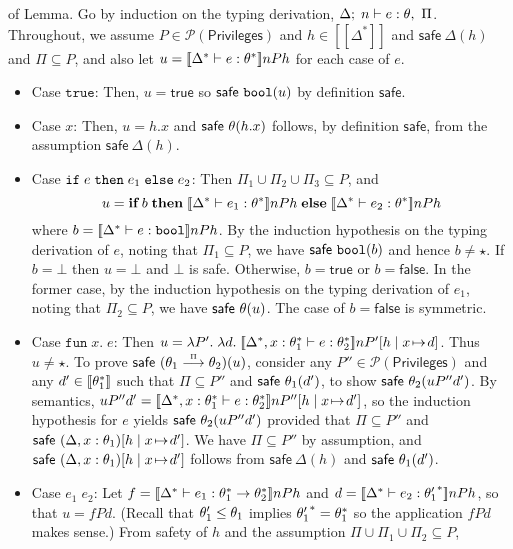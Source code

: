 \documentclass[submission,copyright,creativecommons]{eptcs}
\newcommand{\ifthenelse}[3]{\IF\;#1\;\THEN\;#2\;\ELSE\;#3}
\newcommand{\mifthenelse}[3]{\MIF\;#1\;\MTHEN\;#2\;\MELSE\;#3}
\newcommand{\BOOL}{\mbox{\texttt{bool}}}
\newcommand{\ELSE}{\mbox{\texttt{else}}}
\newcommand{\IF}{\mbox{\texttt{if}}}
\newcommand{\THEN}{{\texttt{then}}}
\newcommand{\MTHEN}{{\textbf{then}}}
\newcommand{\MELSE}{{\textbf{else}}}
\newcommand{\MIF}{{\textbf{if}}}
\newcommand{\TRUE}{{\texttt{true}}}
\renewcommand{\P}{\mathcal{P}}
\newcommand{\ldb}{[\![}
\newcommand{\rdb}{]\!]}
\newcommand{\means}[1]{\ldb {#1}\rdb}
\newcommand{\union}{\cup}
\newcommand{\proves}{\vdash}
\newcommand{\ext}[3]{[#1\mid#2\!\mapsto\!#3]}
\newcommand{\lam}[2]{\lambda #1.\; #2} \newcommand{\all}[2]{\forall #1.\; #2}
\def\lpields#1{\stackrel{#1}{\longrightarrow}}
\newcommand{\annoto}[1]{\lpields {\scriptscriptstyle #1}}
\newcommand{\PRIV}{{\mathsf{Privileges}}}
\newcommand{\safe}{\textsf{safe}}
\newcommand{\LAM}[2]{{\mathtt{fun}\; #1.\; #2}}
\newcommand{\n}{n} \newcommand{\p}{p} \newcommand{\Ps}{\Pi} \newcommand{\h}{h}
\newenvironment{xproof}{\begin{trivlist}\item[\hskip\labelsep{\bf  
Proof:}]}{\end{trivlist}}
\begin{document}
\begin{xproof} of Lemma.
Go by induction on the typing derivation, $\Delta;\;\n\proves e:\th,~\Ps$.
Throughout, we assume $P\in\P(\PRIV)$ and $\h\in\means{\Delta^*}$ and $\safe\
{\Delta}(\h )$ and  $\Ps\subseteq P$, and also let
$u=\means{\Delta^*\proves e:\th^*}\n P \h$ for each case of $e$.
\begin{itemize}
\item Case $\TRUE$:
Then, $u = \mathsf{true}$ so $\safe~ {\BOOL}(u)$ by definition $\safe$.
\item Case $x$:
Then, $u=\h.x$ and $\safe~ {\th}(\h.x)$ follows, by definition $\safe$, 
from the assumption $\safe~ {\Delta}(\h )$.
\item Case $\ifthenelse{e}{e_1}{e_2}$:
Then $\Ps_1\union\Ps_2\union\Ps_3\subseteq P$, and 
\[ u=\mifthenelse{b}{\means{\Delta^*\proves e_1:\th^*}\n P \h}
                  {\means{\Delta^*\proves e_2:\th^*}\n P \h}\]
 where
$b=\means{\Delta^*\proves e:\BOOL}\n P \h$. By the induction hypothesis
on the typing derivation of $e$, noting that $\Ps_1\subseteq P$, we have $\safe\
\BOOL(b)$ and hence $b\neq\star$. 
If $b=\bot$ then $u=\bot$ and $\bot$ is safe.
Otherwise, $b=\mathsf{true}$ or $b=\mathsf{false}$. In the
former case, by the induction hypothesis on the typing derivation of 
$e_1$, noting that $\Ps_2\subseteq P$, we have 
$\safe~ {\th}(u)$. The case of $b=\mathsf{false}$ is symmetric.
\item Case $\LAM{x}{e}$:
Then 
$u=\lam{P'}
       {\lam{d}
            {\means{\Delta^*,x:\th_{1}^*\proves e:\th_{2}^*}\n P'\ext{\h}{x}{d}}}$.
Thus $u\neq\star$. To prove $\safe~(\th_{1}\annoto{\Ps}\th_{2})(u)$, consider any 
$P''\in\P(\PRIV)$ and any $d'\in\means{\th_{1}^*}$ such that 
$\Ps\subseteq P''$ and $\safe~ {\th_{1}}(d')$, to show $\safe~\th_2(u P'' d')$.
By semantics, $u P'' d' = 
\means{\Delta^*,x:\th_{1}^*\proves e:\th_{2}^*}\n P''\ext{\h}{x}{d'}$, 
so the induction hypothesis for $e$ yields $\safe~\th_2(u P'' d')$ provided
that $\Ps\subseteq P''$ and $\safe~ {(\Delta,x:\th_{1})}\ext{\h}{x}{d'}$.
We have $\Ps\subseteq P''$ by assumption, and 
$\safe~ {(\Delta,x:\th_{1})}\ext{\h}{x}{d'}$ follows from $\safe~ {\Delta}(\h )$ and 
$\safe~ {\th_{1}}(d')$.
\item Case $e_1\;e_2$:
Let $f=\means{\Delta^*\proves e_1:\th_{1}^*\to\th_{2}^*}\n P \h$ and 
$d=\means{\Delta^*\proves e_2:{\th'_1}^*}\n P \h$, so that $u=f P d$.  
(Recall that $\theta'_1\leq\theta_1$ implies ${\theta'_1}^*=\theta_{1}^*$ so the
application $f P d$ makes sense.)  From safety of $\h$ and the assumption
$\Ps\union\Ps_1\union\Ps_2\subseteq P$,  

\end{itemize}
\end{xproof}
\end{document}
